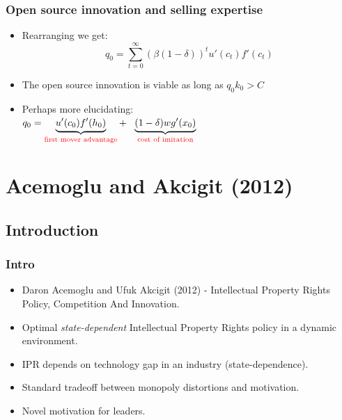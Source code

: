 \documentclass{beamer}
\begin{document}
\begin{frame}[t]\frametitle{Open source innovation and selling expertise}
  \begin{itemize}
    \item Rearranging we get:
    \begin{equation*}
       q_0 = \sum_{t=0}^\infty(\beta(1-\delta))^tu'(c_t)f'(c_t)
    \end{equation*}
     \item The open source innovation is viable as long as $q_0k_0 > C$
     \item Perhaps more elucidating:\\
     $q_0 = \underbrace{u'(c_0)f'(h_0)}_{\text{\color{red}first mover advantage}} +\ \ \underbrace{(1-\delta)wg'(x_0)}_{\text{\color{red}cost of imitation}}$  
  \end{itemize}
\end{frame}


\section{Acemoglu and Akcigit (2012)}
\label{sec:acemoglu_and_akcigit_2012}

\subsection{Introduction}
\label{sub:introduction}

\begin{frame}[t]\frametitle{Intro}
  \begin{itemize}
    \item<+-> Daron Acemoglu and Ufuk Akcigit (2012) - Intellectual Property Rights Policy, Competition And Innovation.
    \item<+-> Optimal \emph{state-dependent} Intellectual Property Rights policy in a dynamic environment.
    \item<+-> IPR depends on technology gap in an industry (state-dependence).
    \item<+-> Standard tradeoff between monopoly distortions and motivation.
    \item<+-> Novel motivation for leaders.
  \end{itemize}
\end{frame}
\end{document}
